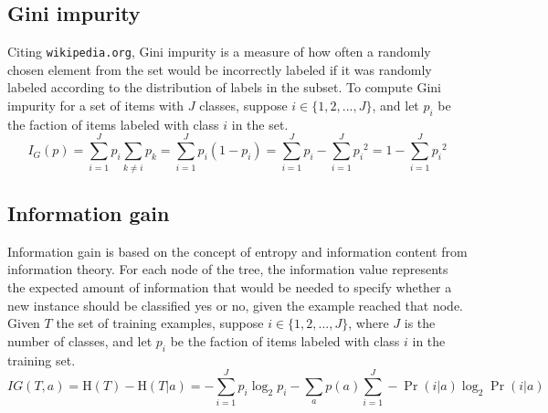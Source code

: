 \documentclass[11pt, a4paper]{article}
\begin{document}
  \subsection{Gini impurity}
    Citing \texttt{wikipedia.org}, Gini impurity is a measure of how often a randomly chosen element from the set would be incorrectly labeled if it was randomly labeled according to the distribution of labels in the subset.
    To compute Gini impurity for a set of items with $J$ classes, suppose $i\in\{1,2,...,J\}$, and let $p_{i}$ be the faction of items labeled with class $i$ in the set.
    \[{I} _{G}(p)=\sum _{i=1}^{J}p_{i}\sum _{k\neq i}p_{k}=\sum _{i=1}^{J}p_{i}(1-p_{i})=\sum _{i=1}^{J}p_{i}-\sum _{i=1}^{J}{p_{i}}^{2}=1-\sum _{i=1}^{J}{p_{i}}^{2}\]
  \subsection{Information gain}
    Information gain is based on the concept of entropy and information content from information theory.
    For each node of the tree, the information value represents the expected amount of information that would be needed to specify whether a new instance should be classified yes or no, given the example reached that node.
    Given $T$ the set of training examples, suppose $i\in\{1,2,...,J\}$, where $J$ is the number of classes, and let $p_{i}$ be the faction of items labeled with class $i$ in the training set.
    \[IG(T, a)=\mathrm{H}(T)-\mathrm{H}(T|a)=-\sum _{i=1}^{J}p_{i}\log _{2}{p_{i}}-\sum _{a}{p(a)\sum _{i=1}^{J}-\Pr(i|a)\log _{2}{\Pr(i|a)}}\]



\end{document}
